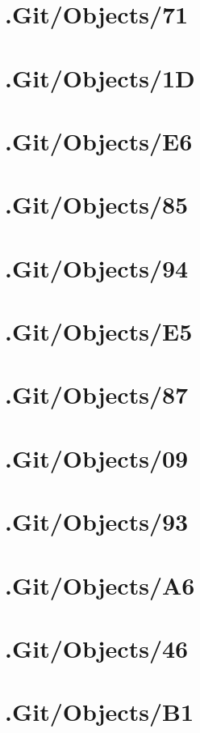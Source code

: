\section*{.Git/Objects/71}

\section*{.Git/Objects/1D}

\section*{.Git/Objects/E6}

\section*{.Git/Objects/85}

\section*{.Git/Objects/94}

\section*{.Git/Objects/E5}

\section*{.Git/Objects/87}

\section*{.Git/Objects/09}

\section*{.Git/Objects/93}

\section*{.Git/Objects/A6}

\section*{.Git/Objects/46}

\section*{.Git/Objects/B1}

